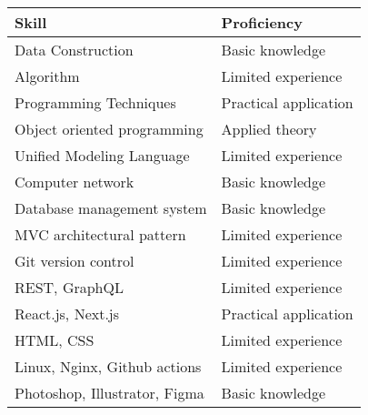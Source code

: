\documentclass[10pt]{article} %
\begin{document}
\vspace{1em}
\begin{center}
  \begin{tabular}{| l | p{} |}
    \hline
    Skill & Proficiency\\
    \hline
    Data Construction & Basic knowledge \\
    Algorithm & Limited experience \\
    Programming Techniques & Practical application \\
    Object oriented programming & Applied theory \\
    Unified Modeling Language & Limited experience \\
    Computer network & Basic knowledge \\
    Database management system & Basic knowledge \\
    \hline
    MVC architectural pattern & Limited experience \\
    Git version control & Limited experience \\
    REST,
    GraphQL & Limited experience \\
    \hline
    React.js, Next.js & Practical application \\
    HTML, CSS & Limited experience \\
    Linux, Nginx, Github actions & Limited experience \\
    \hline
    Photoshop, Illustrator, Figma & Basic knowledge \\
    \hline

  \end{tabular}	
\end{center}
\end{document}
